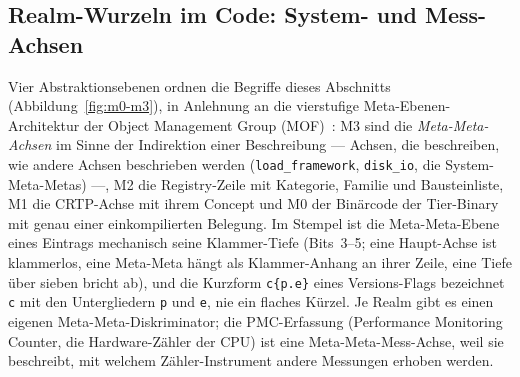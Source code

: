 \begin{nurkurz}
\section{Realm-Wurzeln im Code: System- und Mess-Achsen}\label{sec:impl-system-axes}
Vier Abstraktionsebenen ordnen die Begriffe dieses Abschnitts (Abbildung~\ref{fig:m0-m3}), in Anlehnung an
die vierstufige Meta-Ebenen-Architektur der Object Management Group (MOF)~\cite{omg2016mof}: M3 sind die
\emph{Meta-Meta-Achsen} im Sinne der Indirektion einer Beschreibung --- Achsen, die beschreiben, wie andere
Achsen beschrieben werden (\texttt{load\_framework}, \texttt{disk\_io}, die System-Meta-Metas) ---, M2 die
Registry-Zeile mit Kategorie, Familie und Bausteinliste, M1 die CRTP-Achse mit ihrem Concept und M0 der
Binärcode der Tier-Binary mit genau einer einkompilierten Belegung. Im Stempel ist die Meta-Meta-Ebene
eines Eintrags mechanisch seine Klammer-Tiefe (Bits~3--5; eine Haupt-Achse ist klammerlos, eine Meta-Meta
hängt als Klammer-Anhang an ihrer Zeile, eine Tiefe über sieben bricht ab), und die Kurzform
\texttt{c\{p.e\}} eines Versions-Flags bezeichnet \texttt{c} mit den Untergliedern \texttt{p} und
\texttt{e}, nie ein flaches Kürzel. Je Realm gibt es einen eigenen Meta-Meta-Diskriminator; die
PMC-Erfassung (Performance Monitoring Counter, die Hardware-Zähler der CPU) ist eine Meta-Meta-Mess-Achse,
weil sie beschreibt, mit welchem Zähler-Instrument andere Messungen erhoben werden.
\begin{figure}[htbp]\centering
\end{figure}
\end{nurkurz}
